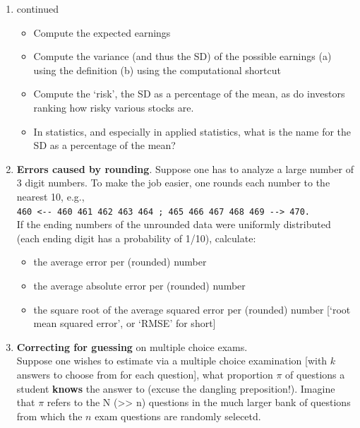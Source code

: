 \documentclass[]{book}
\providecommand{\tightlist}{%
  \setlength{\itemsep}{0pt}\setlength{\parskip}{0pt}}
\begin{document}
\begin{enumerate}
\def\labelenumi{\arabic{enumi}.}
\setcounter{enumi}{1}
\item
  continued

  \begin{itemize}
  \tightlist
  \item
    Compute the expected earnings
  \item
    Compute the variance (and thus the SD) of the possible earnings (a) using the definition (b) using the computational shortcut
  \item
    Compute the `risk', the SD as a percentage of the mean, as do investors ranking how risky various stocks are.
  \item
    In statistics, and especially in applied statistics, what is the name for the SD as a percentage of the mean?
  \end{itemize}
\item
  \textbf{Errors caused by rounding}. Suppose one has to analyze a large number of 3 digit numbers. To make the job easier, one rounds each number to the nearest 10, e.g.,\\
  \texttt{460\ \textless{}-\/-\ 460\ 461\ 462\ 463\ 464\ ;\ 465\ 466\ 467\ 468\ 469\ -\/-\textgreater{}\ 470.}~\\
  If the ending numbers of the unrounded data were uniformly distributed (each ending digit has a probability of 1/10), calculate:

  \begin{itemize}
  \tightlist
  \item
    the average error per (rounded) number
  \item
    the average absolute error per (rounded) number
  \item
    the square root of the average squared error per (rounded)
    number {[}`root mean squared error', or `RMSE' for short{]}
  \end{itemize}
\item
  \textbf{Correcting for guessing} on multiple choice exams.\\
  Suppose one wishes to estimate via a multiple choice examination {[}with \(k\) answers to choose from for each question{]}, what proportion \(\pi\) of questions a student \textbf{knows} the answer to (excuse the dangling preposition!). Imagine that \(\pi\) refers to the N (\textgreater{}\textgreater{} n) questions in the much larger bank of questions from which the \(n\) exam questions are randomly selecetd.


\end{enumerate}
\end{document}
